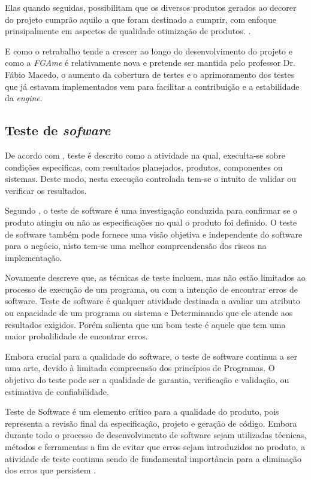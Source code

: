Elas quando seguidas, possibilitam que os diversos produtos gerados ao decorer do projeto cumprão aquilo a que foram destinado a cumprir, com enfoque prinsipalmente em  aspectos de qualidade otimização de produtos.
.\cite{gregor}

E como o retrabalho tende a crescer ao longo do desenvolvimento do projeto e como a \textit{FGAme} é relativamente nova e pretende ser mantida pelo professor Dr. Fábio Macedo, o aumento da cobertura de testes e o aprimoramento dos testes que já estavam implementados vem para facilitar a contribuição e a estabilidade da \textit{engine}.


\subsection{Teste de \textit{sofware}}
	De acordo com \cite{IEEE}, teste é descrito como a atividade na qual, execulta-se sobre condições especificas, com resultados planejados, produtos, componentes ou sistemas. Deste modo, nesta execução controlada tem-se o intuito de validar ou verificar os resultados.


Segundo \cite{artigo_intro_teste}, o teste de software é uma investigação conduzida para confirmar se o produto atingiu ou não as especificações no qual o produto foi definido. O teste de software também pode fornece uma visão objetiva e independente do software para o negócio, nisto tem-se uma melhor compreendensão dos riscos na implementação. 

Novamente \cite{artigo_intro_teste} descreve que, as técnicas de teste incluem, mas não estão limitados ao processo de execução de um programa, ou com a intenção de encontrar erros de software. Teste de software é qualquer atividade destinada a avaliar um atributo ou capacidade de um programa ou sistema e Determinando que ele atende aos resultados exigidos. Porém \cite{artigo_intro_teste} salienta que um bom teste é aquele que tem uma maior probalilidade de encontrar erros.

Embora crucial para a qualidade do software, o teste de software continua a ser uma arte, devido à limitada compreensão dos princípios de Programas. 
 O objetivo do teste pode ser a qualidade de garantia, verificação e validação, ou estimativa de confiabilidade. 

Teste de Software é um elemento crítico para a qualidade do produto, pois representa a revisão final da especificação, projeto e geração de código. Embora durante todo o processo de desenvolvimento de software sejam utilizadas técnicas, métodos e ferramentas a fim de evitar que erros sejam introduzidos no produto, a atividade de teste continua sendo de fundamental importância para a eliminação dos erros que persistem \cite{maldonado}.

